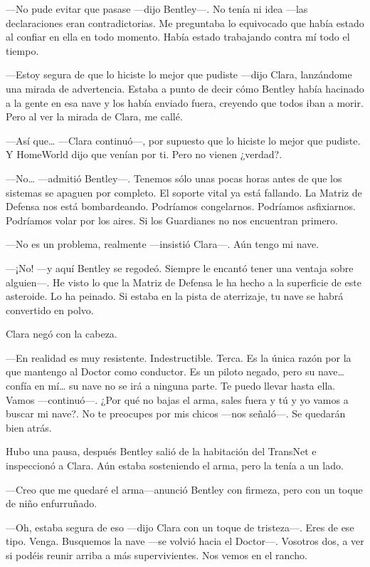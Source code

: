 ---No pude evitar que pasase ---dijo Bentley---. No tenía ni idea ---las
declaraciones eran contradictorias. Me preguntaba lo equivocado que
había estado al confiar en ella en todo momento. Había estado trabajando
contra mí todo el tiempo.

---Estoy segura de que lo hiciste lo mejor que pudiste ---dijo Clara,
lanzándome una mirada de advertencia. Estaba a punto de decir cómo
Bentley había hacinado a la gente en esa nave y los había enviado fuera,
creyendo que todos iban a morir. Pero al ver la mirada de Clara, me
callé.

---Así que\ldots{} ---Clara continuó---, por supuesto que lo hiciste lo
mejor que pudiste. Y HomeWorld dijo que venían por ti. Pero no vienen
¿verdad?.

---No\ldots{} ---admitió Bentley---. Tenemos sólo unas pocas horas antes
de que los sistemas se apaguen por completo. El soporte vital ya está
fallando. La Matriz de Defensa nos está bombardeando. Podríamos
congelarnos. Podríamos asfixiarnos. Podríamos volar por los aires. Si
los Guardianes no nos encuentran primero.

---No es un problema, realmente ---insistió Clara---. Aún tengo mi nave.

---¡No! ---y aquí Bentley se regodeó. Siempre le encantó tener una
ventaja sobre alguien---. He visto lo que la Matriz de Defensa le ha
hecho a la superficie de este asteroide. Lo ha peinado. Si estaba en la
pista de aterrizaje, tu nave se habrá convertido en polvo.

Clara negó con la cabeza.

---En realidad es muy resistente. Indestructible. Terca. Es la única
razón por la que mantengo al Doctor como conductor. Es un piloto negado,
pero su nave\ldots{} confía en mí\ldots{} su nave no se irá a ninguna
parte. Te puedo llevar hasta ella. Vamos ---continuó---. ¿Por qué no
bajas el arma, sales fuera y tú y yo vamos a buscar mi nave?. No te
preocupes por mis chicos ---nos señaló---. Se quedarán bien atrás.

Hubo una pausa, después Bentley salió de la habitación del TransNet e
inspeccionó a Clara. Aún estaba sosteniendo el arma, pero la tenía a un
lado.

---Creo que me quedaré el arma---anunció Bentley con firmeza, pero con
un toque de niño enfurruñado.

---Oh, estaba segura de eso ---dijo Clara con un toque de tristeza---.
Eres de ese tipo. Venga. Busquemos la nave ---se volvió hacia el
Doctor---. Vosotros dos, a ver si podéis reunir arriba a más
supervivientes. Nos vemos en el rancho.

